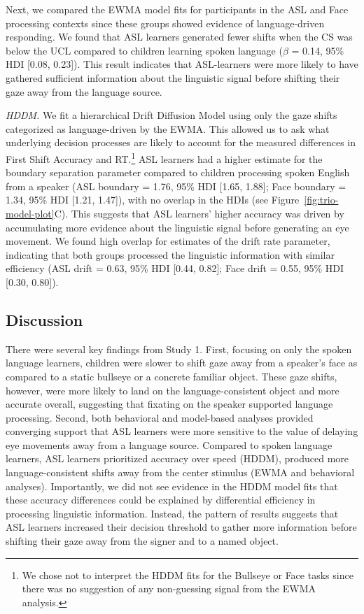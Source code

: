 \documentclass[,man,floatsintext]{apa6}
\let\rmarkdownfootnote\footnote%
\def\footnote{\protect\rmarkdownfootnote}
\begin{document}
Next, we compared the EWMA model fits for participants in the ASL and Face processing contexts since these groups showed evidence of language-driven responding. We found that ASL learners generated fewer shifts when the CS was below the UCL compared to children learning spoken language (\(\beta\) = 0.14, 95\% HDI {[}0.08, 0.23{]}). This result indicates that ASL-learners were more likely to have gathered sufficient information about the linguistic signal before shifting their gaze away from the language source.

\emph{HDDM.} We fit a hierarchical Drift Diffusion Model using only the gaze shifts categorized as language-driven by the EWMA. This allowed us to ask what underlying decision processes are likely to account for the measured differences in First Shift Accuracy and RT.\footnote{We chose not to interpret the HDDM fits for the Bullseye or Face tasks since there was no suggestion of any non-guessing signal from the EWMA analysis.} ASL learners had a higher estimate for the boundary separation parameter compared to children processing spoken English from a speaker (ASL boundary = 1.76, 95\% HDI {[}1.65, 1.88{]}; Face boundary = 1.34, 95\% HDI {[}1.21, 1.47{]}), with no overlap in the HDIs (see Figure~\ref{fig:trio-model-plot}C). This suggests that ASL learners' higher accuracy was driven by accumulating more evidence about the linguistic signal before generating an eye movement. We found high overlap for estimates of the drift rate parameter, indicating that both groups processed the linguistic information with similar efficiency (ASL drift = 0.63, 95\% HDI {[}0.44, 0.82{]}; Face drift = 0.55, 95\% HDI {[}0.30, 0.80{]}).

\hypertarget{discussion}{%
\subsection{Discussion}\label{discussion}}

There were several key findings from Study 1. First, focusing on only the spoken language learners, children were slower to shift gaze away from a speaker's face as compared to a static bullseye or a concrete familiar object. These gaze shifts, however, were more likely to land on the language-consistent object and more accurate overall, suggesting that fixating on the speaker supported language processing. Second, both behavioral and model-based analyses provided converging support that ASL learners were more sensitive to the value of delaying eye movements away from a language source. Compared to spoken language learners, ASL learners prioritized accuracy over speed (HDDM), produced more language-consistent shifts away from the center stimulus (EWMA and behavioral analyses). Importantly, we did not see evidence in the HDDM model fits that these accuracy differences could be explained by differential efficiency in processing linguistic information. Instead, the pattern of results suggests that ASL learners increased their decision threshold to gather more information before shifting their gaze away from the signer and to a named object.
\end{document}
